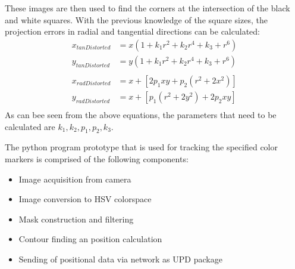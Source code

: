 These images are then used to find the corners at the intersection of the black and white squares. With the previous knowledge of the square sizes, the projection errors in radial and tangential directions can be calculated:
\begin{equation}
\begin{split}
x_{tanDistorted}&=x(1+k_{1}r^{2}+k_{2}r^{4}+k_{3}+r^{6})\\
y_{tanDistorted}&=y(1+k_{1}r^{2}+k_{2}r^{4}+k_{3}+r^{6})\\
\\
x_{radDistorted}&=x+[2p_{1}xy+p_{2}(r^{2}+2x^{2})]\\
y_{radDistorted}&=x+[p_{1}(r^{2}+2y^{2})+2p_{2}xy]\\
\end{split}
\end{equation} 
As can bee seen from the above equations, the parameters that need to be calculated are $k_{1},k_{2},p_{1},p_{2},k_{3}$.

The python program prototype that is used for tracking the specified color markers is comprised of the following components:
\begin{itemize}
\item Image acquisition from camera
\item Image conversion to HSV colorspace
\item Mask construction and filtering
\item Contour finding an position calculation
\item Sending of positional data via network as UPD package
\end{itemize}
